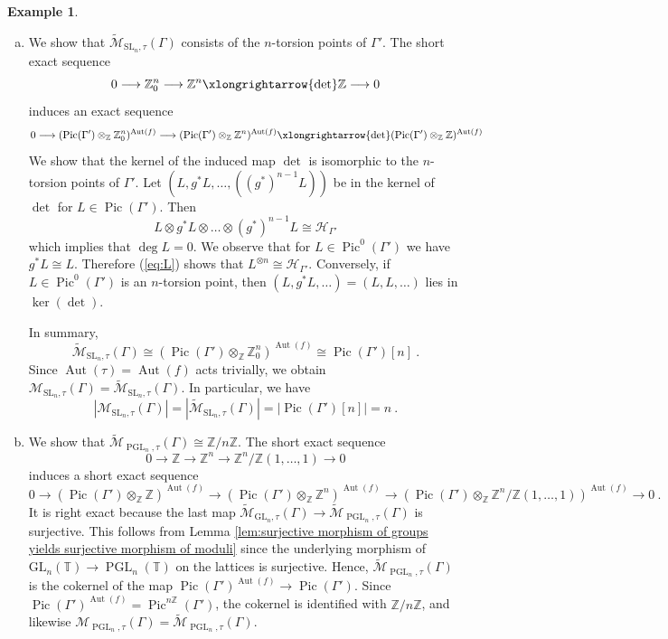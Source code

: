 \documentclass[10pt, a4paper]{amsart}
\theoremstyle{definition}
\newtheorem{example}[theorem]{Example}
\theoremstyle{myitemstyle}
\newcommand{\Z}{\mathbb{Z}}
\newcommand{\T}{\mathbb{T}}
\newcommand{\calH}{\mathcal{H}}
\newcommand{\calM}{\mathcal{M}}
\newcommand{\wmc}[1]{{\widetilde{\mathcal{#1}}}}
\DeclareMathOperator{\Pic}{Pic}
\DeclareMathOperator{\Aut}{Aut}
\DeclareMathOperator{\PGL}{PGL}
\newcommand{\SL}{{\mathrm{SL}}}
\newcommand{\GL}{{\mathrm{GL}}}
\newcommand{\Ga}{\Gamma}
\begin{document}
\begin{example}
\begin{enumerate}[(a)]
    
    \item  We show that $\wmc M_{\SL_n,\tau}(\Ga)$ consists of the $n$-torsion points of $\Gamma'$. 
    The short exact sequence
    \[
    0 \longrightarrow \Z^n_0 \longrightarrow \Z^n \xlongrightarrow{\det} \Z \longrightarrow 0
    \]
    induces an exact sequence
    \[
    0 \longrightarrow (\Pic(\Gamma') \otimes_\Z \Z^n_0)^{\Aut(f)} \longrightarrow (\Pic(\Gamma') \otimes_\Z \Z^n)^{\Aut(f)} \xlongrightarrow{\det} (\Pic(\Gamma') \otimes_\Z \Z)^{\Aut(f)}
    \]
    We show that the kernel of the induced map $\det$ is isomorphic to the $n$-torsion points of $\Gamma'$.
    Let $(L,g^{*}L,\dots,((g^{*})^{n-1}L))$ be in the kernel of $\det$ for $L \in \Pic(\Gamma')$. Then 
    \begin{equation}
    \label{eq:L}
        L \otimes g^{*}L \otimes \dots \otimes (g^{*})^{n-1}L \cong \calH_{\Gamma'}
    \end{equation}
    which implies that $\deg L = 0$. 
    We observe that for $L \in \Pic^0(\Gamma')$ we have $g^{*}L \cong L$.
    Therefore (\ref{eq:L}) shows that $L^{\otimes n} \cong \calH_{\Gamma'}$. Conversely, if $L \in \Pic^0(\Gamma')$ is an $n$-torsion point, then $(L,g^{*}L,\dots) = (L,L,\dots)$ lies in $\ker(\det)$.

    In summary,
    \[
    \wmc M_{\SL_n,\tau}(\Ga) \cong (\Pic(\Gamma') \otimes_\Z \Z^n_0)^{\Aut(f)} \cong \Pic(\Gamma')[n] \ .
    \]
    Since $\Aut(\tau) = \Aut(f)$ acts trivially, we obtain $\calM_{\SL_n,\tau}(\Ga) = \wmc M_{\SL_n,\tau}(\Ga)$. In particular, we have 
    \[
    |\calM_{\SL_n,\tau}(\Ga)| = |\wmc M_{\SL_n,\tau}(\Ga)|=|\Pic(\Gamma')[n]|=n \ .
    \]
    \item 
    We show that $\wmc M_{\PGL_n,\tau}(\Gamma) \cong \Z / n\Z$. The short exact sequence
    \[
    0 \to \Z \to \Z^n \to \Z^n/\Z(1,\dots,1) \to 0
    \]
    induces a short exact sequence
    \[
    0 \to (\Pic(\Gamma') \otimes_\Z \Z)^{\Aut(f)} \to (\Pic(\Gamma') \otimes_\Z \Z^n)^{\Aut(f)} \to (\Pic(\Gamma') \otimes_\Z \Z^n / \Z(1,\ldots,1))^{\Aut(f)} \to 0 \ .
    \]
    It is right exact because the last map $\wmc M_{\GL_n,\tau}(\Ga) \to \wmc M_{\PGL_n,\tau}(\Ga)$ is surjective. This follows from Lemma \ref{lem:surjective morphism of groups yields surjective morphism of moduli} since the underlying morphism of $\GL_n(\T) \to \PGL_n(\T)$ on the lattices is surjective.
    Hence, $\wmc M_{\PGL_n,\tau}(\Ga)$ is the cokernel of the map $\Pic(\Gamma')^{\Aut(f)} \to \Pic(\Gamma')$. Since $\Pic(\Gamma')^{\Aut(f)} = \Pic^{n\Z}(\Gamma')$, the cokernel is identified with $\Z / n\Z$, and likewise $\calM_{\PGL_n,\tau}(\Ga) = \wmc M_{\PGL_n,\tau}(\Ga)$.
\end{enumerate}
\end{example}
\end{document}
